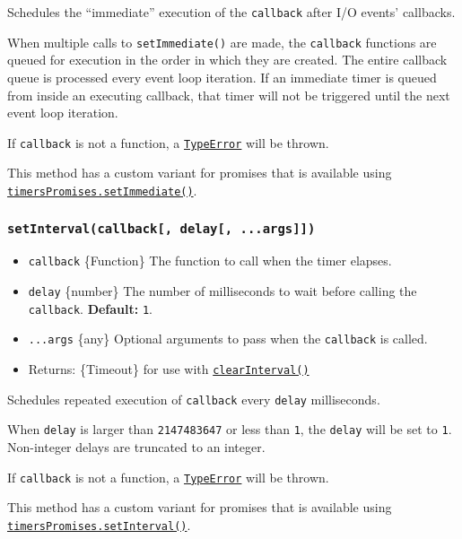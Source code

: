 Schedules the ``immediate'' execution of the \texttt{callback} after I/O
events' callbacks.

When multiple calls to \texttt{setImmediate()} are made, the
\texttt{callback} functions are queued for execution in the order in
which they are created. The entire callback queue is processed every
event loop iteration. If an immediate timer is queued from inside an
executing callback, that timer will not be triggered until the next
event loop iteration.

If \texttt{callback} is not a function, a
\href{errors.md\#class-typeerror}{\texttt{TypeError}} will be thrown.

This method has a custom variant for promises that is available using
\hyperref[timerspromisessetimmediatevalue-options]{\texttt{timersPromises.setImmediate()}}.

\subsubsection{\texorpdfstring{\texttt{setInterval(callback{[},\ delay{[},\ ...args{]}{]})}}{setInterval(callback{[}, delay{[}, ...args{]}{]})}}\label{setintervalcallback-delay-...args}

\begin{itemize}
\tightlist
\item
  \texttt{callback} \{Function\} The function to call when the timer
  elapses.
\item
  \texttt{delay} \{number\} The number of milliseconds to wait before
  calling the \texttt{callback}. \textbf{Default:} \texttt{1}.
\item
  \texttt{...args} \{any\} Optional arguments to pass when the
  \texttt{callback} is called.
\item
  Returns: \{Timeout\} for use with
  \hyperref[clearintervaltimeout]{\texttt{clearInterval()}}
\end{itemize}

Schedules repeated execution of \texttt{callback} every \texttt{delay}
milliseconds.

When \texttt{delay} is larger than \texttt{2147483647} or less than
\texttt{1}, the \texttt{delay} will be set to \texttt{1}. Non-integer
delays are truncated to an integer.

If \texttt{callback} is not a function, a
\href{errors.md\#class-typeerror}{\texttt{TypeError}} will be thrown.

This method has a custom variant for promises that is available using
\hyperref[timerspromisessetintervaldelay-value-options]{\texttt{timersPromises.setInterval()}}.

